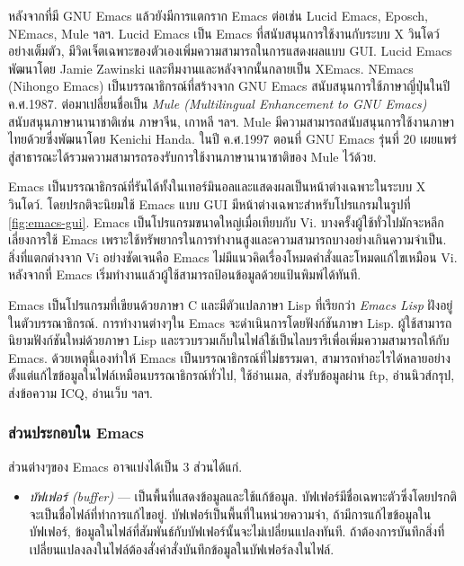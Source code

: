 \begin{thwbr}
หลังจากที่มี GNU Emacs แล้วยังมีการแตกราก Emacs ต่อเช่น Lucid Emacs, Eposch, NEmacs, Mule ฯลฯ. Lucid Emacs เป็น Emacs ที่สนับสนุนการใช้งานกับระบบ X วินโดว์อย่างเต็มตัว, มีวิดเจ็ตเฉพาะของตัวเองเพิ่มความสามารถในการแสดงผลแบบ GUI. Lucid Emacs พัฒนาโดย Jamie Zawinski และทีมงานและหลังจากนั้นกลายเป็น XEmacs. NEmacs (Nihongo Emacs) เป็นบรรณาธิกรณ์ที่สร้างจาก GNU Emacs สนับสนุนการใช้ภาษาญี่ปุ่นในปี ค.ศ.1987. ต่อมาเปลี่ยนชื่อเป็น \emph{Mule (Multilingual Enhancement to GNU Emacs)} สนับสนุนภาษานานาชาติเช่น ภาษาจีน, เกาหลี ฯลฯ. Mule มีความสามารถสนับสนุนการใช้งานภาษาไทยด้วยซึ่งพัฒนาโดย Kenichi Handa. ในปี ค.ศ.1997 ตอนที่ GNU Emacs รุ่นที่ 20 เผยแพร่สู่สาธารณะได้รวมความสามารถรองรับการใช้งานภาษานานาชาติของ Mule ไว้ด้วย. 

\begin{figure}[!htb]
\end{figure}
\begin{figure}[!htb]
\end{figure}


Emacs เป็นบรรณาธิกรณ์ที่รันได้ทั้งในเทอร์มินอลและแสดงผลเป็นหน้าต่างเฉพาะในระบบ X วินโดว์. โดยปรกติจะนิยมใช้ Emacs แบบ GUI มีหน้าต่างเฉพาะสำหรับโปรแกรมในรูปที่ \ref{fig:emacs-gui}. Emacs เป็นโปรแกรมขนาดใหญ่เมื่อเทียบกับ Vi. บางครั้งผู้ใช้ทั่วไปมักจะหลีกเลี่ยงการใช้ Emacs เพราะใช้ทรัพยากรในการทำงานสูงและความสามารถบางอย่างเกินความจำเป็น. สิ่งที่แตกต่างจาก Vi อย่างชัดเจนคือ Emacs ไม่มีแนวคิดเรื่องโหมดคำสั่งและโหมดแก้ไขเหมือน Vi. หลังจากที่ Emacs เริ่มทำงานแล้วผู้ใช้สามารถป้อนข้อมูลด้วยแป้นพิมพ์ได้ทันที.

Emacs เป็นโปรแกรมที่เขียนด้วยภาษา C และมีตัวแปลภาษา Lisp ที่เรียกว่า \emph{Emacs Lisp} ฝังอยู่ในตัวบรรณาธิกรณ์. การทำงานต่างๆใน Emacs จะดำเนินการโดยฟังก์ชันภาษา Lisp. ผู้ใช้สามารถนิยามฟังก์ชันใหม่ด้วยภาษา Lisp และรวบรวมเก็บในไฟล์ใช้เป็นไลบรารีเพื่อเพิ่มความสามารถให้กับ Emacs. ด้วยเหตุนี้เองทำให้ Emacs เป็นบรรณาธิกรณ์ที่ไม่ธรรมดา, สามารถทำอะไรได้หลายอย่างตั้งแต่แก้ไขข้อมูลในไฟล์เหมือนบรรณาธิกรณ์ทั่วไป, ใช้อ่านเมล, ส่งรับข้อมูลผ่าน ftp, อ่านนิวส์กรุป, ส่งข้อความ ICQ, อ่านเว็บ ฯลฯ. 

\subsubsection{ส่วนประกอบใน Emacs}
ส่วนต่างๆของ Emacs อาจแบ่งได้เป็น 3 ส่วนได้แก่.
\begin{itemize}
\item \emph{บัฟเฟอร์ (buffer)} --- เป็นพื้นที่แสดงข้อมูลและใช้แก้ข้อมูล. บัฟเฟอร์มีชื่อเฉพาะตัวซึ่งโดยปรกติจะเป็นชื่อไฟล์ที่ทำการแก้ไขอยู่. บัฟเฟอร์เป็นพื้นที่ในหน่วยความจำ, ถ้ามีการแก้ไขข้อมูลในบัฟเฟอร์, ข้อมูลในไฟล์ที่สัมพันธ์กับบัฟเฟอร์นั้นจะไม่เปลี่ยนแปลงทันที. ถ้าต้องการบันทึกสิ่งที่เปลี่ยนแปลงลงในไฟล์ต้องสั่งคำสั่งบันทึกข้อมูลในบัฟเฟอร์ลงในไฟล์. 


\end{itemize}
\end{thwbr}
